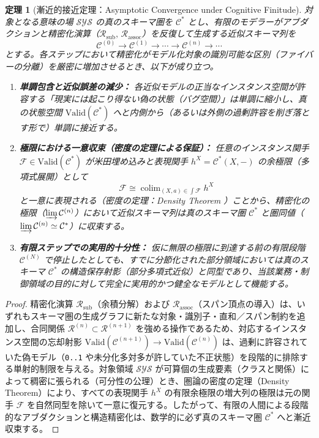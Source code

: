 \documentclass[11pt,a4paper]{ltjsarticle}
\theoremstyle{definition}
\theoremstyle{plain}
\newtheorem{theorem}{定理}[section]
\theoremstyle{remark}
\newcommand{\Valid}{\mathrm{Valid}}
\newcommand{\colim}{\operatorname{colim}}
\newcommand{\Rsub}{\mathcal{R}_{\mathrm{sub}}}
\newcommand{\Rassoc}{\mathcal{R}_{\mathrm{assoc}}}
\begin{document}
\begin{theorem}[漸近的接近定理：Asymptotic Convergence under Cognitive Finitude]\label{thm:convergence}
対象となる意味の場 $\mathcal{SYS}$ の真のスキーマ圏を $\mathcal{C}^*$ とし、有限のモデラーがアブダクションと精密化演算（$\Rsub,\, \Rassoc$）を反復して生成する近似スキーマ列を
\begin{equation}
\mathcal{C}^{(0)} \longrightarrow \mathcal{C}^{(1)} \longrightarrow \cdots \longrightarrow \mathcal{C}^{(n)} \longrightarrow \cdots
\end{equation}
とする。各ステップにおいて精密化がモデル化対象の識別可能な区別（ファイバーの分離）を厳密に増加させるとき、以下が成り立つ。
\begin{enumerate}
    \item \textbf{単調包含と近似誤差の減少：} 各近似モデルの正当なインスタンス空間が許容する「現実には起こり得ない偽の状態（バグ空間）」は単調に縮小し、真の状態空間 $\Valid(\mathcal{C}^*)$ へと内側から（あるいは外側の過剰許容を削ぎ落とす形で）単調に接近する。
    \item \textbf{極限における一意収束（密度の定理による保証）：} 任意のインスタンス関手 $\mathcal{F} \in \Valid(\mathcal{C}^*)$ が米田埋め込みと表現関手 $h^X = \mathcal{C}^*(X, -)$ の余極限（多項式展開）として
    \begin{equation}
    \mathcal{F} \cong \colim_{(X, a) \in \int \mathcal{F}} h^X
    \end{equation}
    と一意に表現される（密度の定理：Density Theorem \cite{maclane1998,maclane1992}）ことから、精密化の極限（$\varinjlim \mathcal{C}^{(n)}$）において近似スキーマ列は真のスキーマ圏 $\mathcal{C}^*$ と圏同値（$\varinjlim \mathcal{C}^{(n)} \simeq \mathcal{C}^*$）に収束する。
    \item \textbf{有限ステップでの実用的十分性：} 仮に無限の極限に到達する前の有限段階 $\mathcal{C}^{(N)}$ で停止したとしても、すでに分節化された部分領域においては真のスキーマ $\mathcal{C}^*$ の構造保存射影（部分多項式近似）と同型であり、当該業務・制御領域の目的に対して完全に実用的かつ健全なモデルとして機能する。
\end{enumerate}
\end{theorem}

\begin{proof}
精密化演算 $\Rsub$（余積分解）および $\Rassoc$（スパン頂点の導入）は、いずれもスキーマ圏の生成グラフに新たな対象・識別子・直和／スパン制約を追加し、合同関係 $\mathcal{R}^{(n)} \subset \mathcal{R}^{(n+1)}$ を強める操作であるため、対応するインスタンス空間の忘却射影 $\Valid(\mathcal{C}^{(n+1)}) \to \Valid(\mathcal{C}^{(n)})$ は、過剰に許容されていた偽モデル（\texttt{0..1} や未分化多対多が許していた不正状態）を段階的に排除する単射的制限を与える。対象領域 $\mathcal{SYS}$ が可算個の生成要素（クラスと関係）によって稠密に張られる（可分性の公理）とき、圏論の密度の定理（Density Theorem）により、すべての表現関手 $h^X$ の有限余極限の増大列の極限は元の関手 $\mathcal{F}$ を自然同型を除いて一意に復元する。したがって、有限の人間による段階的なアブダクションと構造精密化は、数学的に必ず真のスキーマ圏 $\mathcal{C}^*$ へと漸近収束する。 \qedhere
\end{proof}
\end{document}
